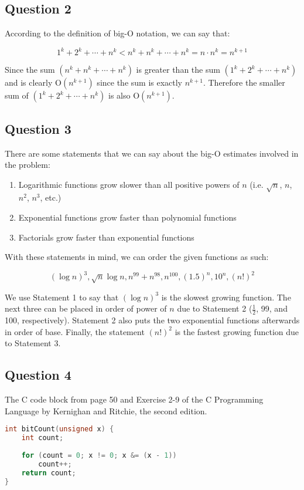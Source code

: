 \documentclass[letterpaper, 12pt]{article}
\begin{document}
\subsection*{Question 2}
According to the definition of big-$\mathrm{O}$ notation, we can say that:

\[1^k + 2^k + \cdots + n^k < n^k + n^k + \cdots + n^k = n \cdot n^k = n^{k+1}\]

Since the sum $(n^k + n^k + \cdots + n^k)$ is greater than the sum $(1^k + 2^k + \cdots + n^k)$ and is clearly $\mathrm{O}(n^{k+1})$ since the sum is exactly $n^{k+1}$. Therefore the smaller sum of $(1^k + 2^k + \cdots + n^k)$ is also $\mathrm{O}(n^{k+1})$.

\subsection*{Question 3}
There are some statements that we can say about the big-$\mathrm{O}$ estimates involved in the problem:
\begin{enumerate}[label=\arabic*.]
    \item Logarithmic functions grow slower than all positive powers of $n$ (i.e. $\sqrt{n}$, $n$, $n^2$, $n^3$, etc.)
    \item Exponential functions grow faster than polynomial functions
    \item Factorials grow faster than exponential functions
\end{enumerate}

With these statements in mind, we can order the given functions as such:

\[(\log{n})^3, \sqrt{n}\log{n}, n^{99} + n^{98}, n^{100}, (1.5)^n, 10^n, (n!)^2\]

We use Statement 1 to say that $(\log{n})^3$ is the slowest growing function. The next three can be placed in order of power of $n$ due to Statement 2 ($\frac{1}{2}$, 99, and 100, respectively). Statement 2 also puts the two exponential functions afterwards in order of base. Finally, the statement $(n!)^2$ is the fastest growing function due to Statement 3.

\subsection*{Question 4}
The C code block from page 50 and Exercise 2-9 of the C Programming Language by Kernighan and Ritchie, the second edition.

\begin{lstlisting}[language=C]
int bitCount(unsigned x) {
    int count;
    
    for (count = 0; x != 0; x &= (x - 1))
        count++;
    return count;
}
\end{lstlisting}
\end{document}
